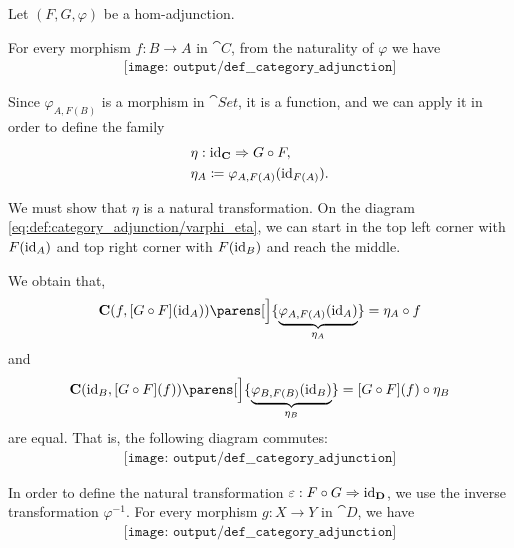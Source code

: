 \begin{defproof}
   Let \( (F, G, \varphi) \) be a hom-adjunction.

  For every morphism \( f: B \to A \) in \( \cat{C} \), from the naturality of \( \varphi \) we have
  \begin{equation}\label{eq:def:category_adjunction/varphi_eta}
    \begin{aligned}
      \texttt{[image: output/def\_\_category\_adjunction]}
    \end{aligned}
  \end{equation}

  Since \( \varphi_{A,F(B)} \) is a morphism in \( \cat{Set} \), it is a function, and we can apply it in order to define the family
  \begin{equation*}
    \begin{aligned}
      &\eta: \id_{\cat{C}} \Rightarrow G \bincirc F, \\
      &\eta_A \coloneqq \varphi_{A,F(A)}(\id_{F(A)}).
    \end{aligned}
  \end{equation*}

  We must show that \( \eta \) is a natural transformation. On the diagram \eqref{eq:def:category_adjunction/varphi_eta}, we can start in the top left corner with \( F(\operatorname{id}_A) \) and top right corner with \( F(\operatorname{id}_B) \) and reach the middle.

  We obtain that,
  \begin{equation*}
    \cat{C}(f, [G \bincirc F](\id_A))\parens[\Big]{ \underbrace{\varphi_{A, F(A)}(\id_A)}_{\eta_A} }
    =
    \eta_A \bincirc f
  \end{equation*}
  and
  \begin{equation*}
    \cat{C}(\id_B, [G \bincirc F](f))\parens[\Big]{ \underbrace{\varphi_{B, F(B)}(\id_B)}_{\eta_B} }
    =
    [G \bincirc F](f) \bincirc \eta_B
  \end{equation*}
  are equal. That is, the following diagram commutes:
  \begin{equation}\label{eq:def:category_adjunction/eta_nat}
    \begin{aligned}
      \texttt{[image: output/def\_\_category\_adjunction]}
    \end{aligned}
  \end{equation}

  In order to define the natural transformation \( \varepsilon: F \bincirc G \Rightarrow \id_{\cat{D}} \), we use the inverse transformation \( \varphi^{-1} \). For every morphism \( g: X \to Y \) in \( \cat{D} \), we have
  \begin{equation}\label{eq:def:category_adjunction/varphi_varepsilon}
    \begin{aligned}
      \texttt{[image: output/def\_\_category\_adjunction]}
    \end{aligned}
  \end{equation}


\end{defproof}
